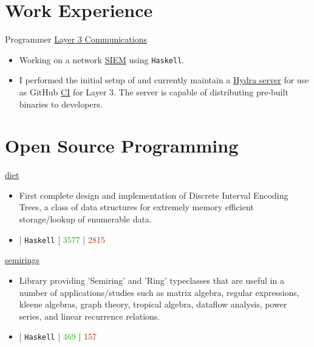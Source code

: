 \documentclass[10pt,letterpaper,sans]{moderncv}
\newcommand{\wlink}[2]{\textcolor[HTML]{0020B6}{\href{#1}{#2}}}
\newcommand{\ghlink}[2]{\wlink{https://github.com/#1}{#2}}
\newcommand{\ghrepo}[1]{\ghlink{#1}{\faGithub}}
\newcommand{\ghlang}[1]{\texttt{#1}}
\newcommand{\ghadd}[1]{\textcolor[HTML]{30A622}{{\faPlusCircle} #1}}
\newcommand{\ghrem}[1]{\textcolor[HTML]{BD2C00}{{\faMinusCircle} #1}}
\newcommand{\ghub}[4]{\ghrepo{#2} | \ghlang{#1} | \ghadd{#3} | \ghrem{#4}}
\newcommand{\lang}[1]{\texttt{#1}}
\begin{document}
\makecvtitle{}


\section{Work Experience}
        {Programmer}
        {\wlink{https://www.layer3com.com}{Layer 3 Communications}}
        {}{}
        {
\begin{itemize}
  \item Working on a network \wlink{https://en.wikipedia.org/wiki/Security_information_and_event_management}{SIEM} using \lang{Haskell}.
\item I performed the initial setup of and currently maintain a \wlink{https://github.com/NixOS/hydra}{Hydra server} for use as GitHub \wlink{https://en.wikipedia.org/wiki/Continuous_integration}{CI} for Layer 3. The server is capable of distributing pre-built binaries to developers.
\end{itemize}
}


\section{Open Source Programming}
\cventry{}
        {\wlink{https://github.com/chessai/diet}{diet}}
        {}{}{}
        {
\begin{itemize}
\item First complete design and implementation of Discrete Interval Encoding Trees, a class of data structures for extremely memory efficient storage/lookup of enumerable data.
\item \ghub{Haskell}{chessai/diet}{3577}{2815}
\end{itemize}
}

\cventry{}
        {\wlink{https://github.com/chessai/semirings}{semirings}}
        {}{}{}
        {
\begin{itemize}
\item Library providing 'Semiring' and 'Ring' typeclasses that are useful in a number of applications/studies such as matrix algebra, regular expressions, kleene algebras, graph theory, tropical algebra, dataflow analysis, power series, and linear recurrence relations.
\item \ghub{Haskell}{chessai/semirings}{469}{157}
\end{itemize}
}
\end{document}
